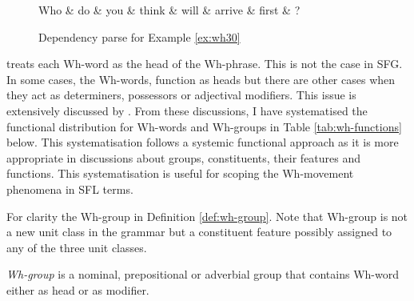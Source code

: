 \begin{figure}[!ht]
	\centering
	\begin{dependency}
		\begin{deptext}[]
			Who \& do \& you \& think \& will \& arrive \& first \& ?\\
		\end{deptext}
	\end{dependency}
	\caption{Dependency parse for Example \ref{ex:wh30}}
	\label{fig:e19}
\end{figure}


\citet[375]{Haegeman1991} treats each Wh-word as the head of the Wh-phrase. This is not the case in SFG. In some cases, the Wh-words, function as heads but there are other cases when they act as determiners, possessors or adjectival modifiers. This issue is extensively discussed by \citet{Abney1987,Quirk1985,Halliday2013}. From these discussions, I have systematised the functional distribution for Wh-words and Wh-groups in Table \ref{tab:wh-functions} below. This systematisation follows a systemic functional approach as it is more appropriate in discussions about groups, constituents, their features and functions. This systematisation is useful for scoping the Wh-movement phenomena in SFL terms.

For clarity the Wh-group in Definition \ref{def:wh-group}. Note that Wh-group is not a new unit class in the grammar but a constituent feature possibly assigned to any of the three unit classes.

\begin{definition}[Wh-group]\label{def:wh-group}
    \textit{Wh-group} is a nominal, prepositional or adverbial group that contains Wh-word either as head or as modifier. 
\end{definition}



